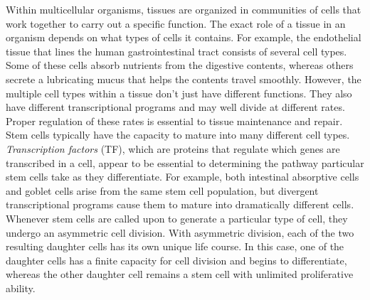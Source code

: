 Within multicellular organisms, tissues are organized in communities of cells that work together to carry out a specific function. The exact role of a tissue in an organism depends on what types of cells it contains. For example, the endothelial tissue that lines the human gastrointestinal tract consists of several cell types. Some of these cells absorb nutrients from the digestive contents, whereas others secrete a lubricating mucus that helps the contents travel smoothly.
However, the multiple cell types within a tissue don't just have different functions. They also have different transcriptional programs and may well divide at different rates. Proper regulation of these rates is essential to tissue maintenance and repair. 
Stem cells typically have the capacity to mature into many different cell types. \emph{Transcription factors} (TF), which are proteins that regulate which genes are transcribed in a cell, appear to be essential to determining the pathway particular stem cells take as they differentiate. For example, both intestinal absorptive cells and goblet cells arise from the same stem cell population, but divergent transcriptional programs cause them to mature into dramatically different cells.
Whenever stem cells are called upon to generate a particular type of cell, they undergo an asymmetric cell division. With asymmetric division, each of the two resulting daughter cells has its own unique life course. In this case, one of the daughter cells has a finite capacity for cell division and begins to differentiate, whereas the other daughter cell remains a stem cell with unlimited proliferative ability.


